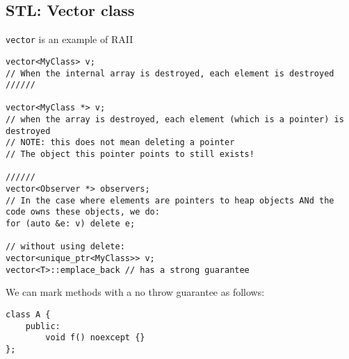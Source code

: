 \documentclass[12pt]{article}
\begin{document}
\subsection{STL: Vector class}
\lstinline{vector} is an example of RAII
\begin{lstlisting}
vector<MyClass> v;
// When the internal array is destroyed, each element is destroyed
//////

vector<MyClass *> v;
// when the array is destroyed, each element (which is a pointer) is destroyed
// NOTE: this does not mean deleting a pointer
// The object this pointer points to still exists!

//////
vector<Observer *> observers;
// In the case where elements are pointers to heap objects ANd the code owns these objects, we do:
for (auto &e: v) delete e;

// without using delete:
vector<unique_ptr<MyClass>> v;
vector<T>::emplace_back // has a strong guarantee
\end{lstlisting}

We can mark methods with a no throw guarantee as follows:
\begin{lstlisting}
class A {
    public:
        void f() noexcept {}
};
\end{lstlisting}
\end{document}
